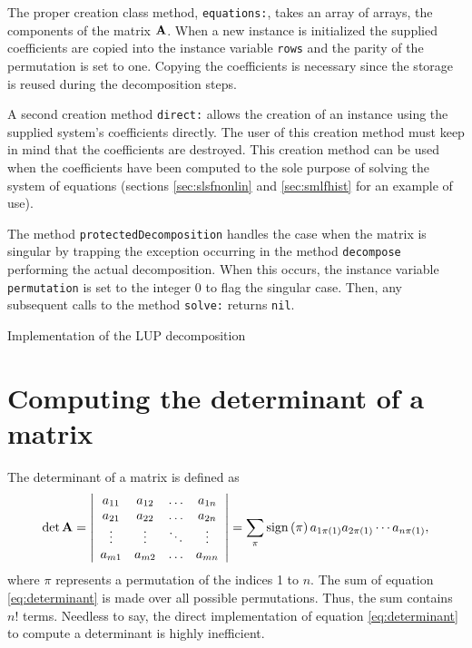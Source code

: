 \documentclass[twoside]{book}
\begin{document}
The proper creation class method, {\tt equations:}, takes an array
of arrays, the components of the matrix ${\bf A}$. When a new
instance is initialized the supplied coefficients are copied into
the instance variable {\tt rows} and the parity of the permutation
is set to one. Copying the coefficients is necessary since the
storage is reused during the decomposition steps. 

A second creation method {\tt direct:} allows the creation of an
instance using the supplied system's coefficients directly. The
user of this creation method must keep in mind that the
coefficients are destroyed. This creation method can be used when
the coefficients have been computed to the sole purpose of solving
the system of equations (\cf sections \ref{sec:slsfnonlin} and
\ref{sec:smlfhist} for an example of use).

The method {\tt protectedDecomposition} handles the case when the
matrix is singular by trapping the exception occurring in the
method {\tt decompose} performing the actual decomposition. When
this occurs, the instance variable {\tt permutation} is set to the
integer 0 to flag the singular case. Then, any subsequent calls to
the method {\tt solve:} returns {\tt nil}.

\begin{listing} Implementation of the LUP decomposition
\label{ls:lup}

\end{listing}


\section{Computing the determinant of a matrix}
\label{sec:determinant} The determinant of a matrix is defined
as
\begin{equation}
\label{eq:determinant}
  \det{\bf A}=\left|
  \begin{array}{cccc}a_{11}& a_{12}&\ldots& a_{1n}\\
  a_{21}& a_{22}&\ldots& a_{2n}\\
  \vdots&\vdots&\ddots&\vdots\\
  a_{m1}& a_{m2}&\ldots& a_{mn}\\ \end{array}
  \right|=\sum_{\pi}\mathop{\rm sign}\left({\pi}\right) a_{1\pi\left(1\right)}a_{2\pi\left(1\right)}
  \cdots a_{n\pi\left(1\right)},
\end{equation}
where $\pi$ represents a permutation of the indices 1 to $n$. The
sum of equation \ref{eq:determinant} is made over all possible
permutations. Thus, the sum contains $n!$ terms. Needless to say,
the direct implementation of equation \ref{eq:determinant} to
compute a determinant is highly inefficient.
\end{document}
